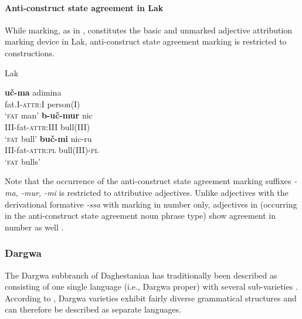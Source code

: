 \paragraph*{Anti\hyp{}construct state agreement in Lak}
While  marking, as in , constitutes the basic and unmarked adjective attribution marking device in Lak, anti\hyp{}construct state agreement marking is restricted to  constructions.
\begin{exe}
\ex 
{\rm Lak \citep[45]{zirkov1955}}
\begin{xlist}
\ex
\gll	\textbf{uč-ma} adimina\\
	fat.\textsc{I}-\textsc{attr:I} person\textsc{(I)}\\
\glt	‘\textsc{fat} man’
\ex
\gll	\textbf{b-uč-mur} nic\\
	\textsc{III}-fat-\textsc{attr:III} bull\textsc{(III)}\\
\glt	‘\textsc{fat} bull’
\ex
\gll	\textbf{buč-mi} nic-ru\\
	\textsc{III}-fat-\textsc{attr:pl} bull\textsc{(III)}-\textsc{pl}\\
\glt	‘\textsc{fat} bulls’
\end{xlist}
\end{exe}
Note that the occurrence of the anti\hyp{}construct state agreement marking suffixes \textit{-ma, -mur, -mi} is restricted to attributive adjectives. Unlike adjectives with the derivational formative \textit{-ssa} with  marking in number only, adjectives in  (occurring in the anti\hyp{}construct state agreement noun phrase type) show agreement in number as well \citep[45–51]{zirkov1955}.

\subsubsection{Dargwa}
The Dargwa subbranch of Daghestanian has traditionally been described as consisting of one single language (i.e., Dargwa proper) with several sub-varieties \citep[233]{salminen2007}. According to \citet{korjakov2006a}, Dargwa varieties exhibit fairly diverse grammatical structures and can therefore be described as separate languages.

